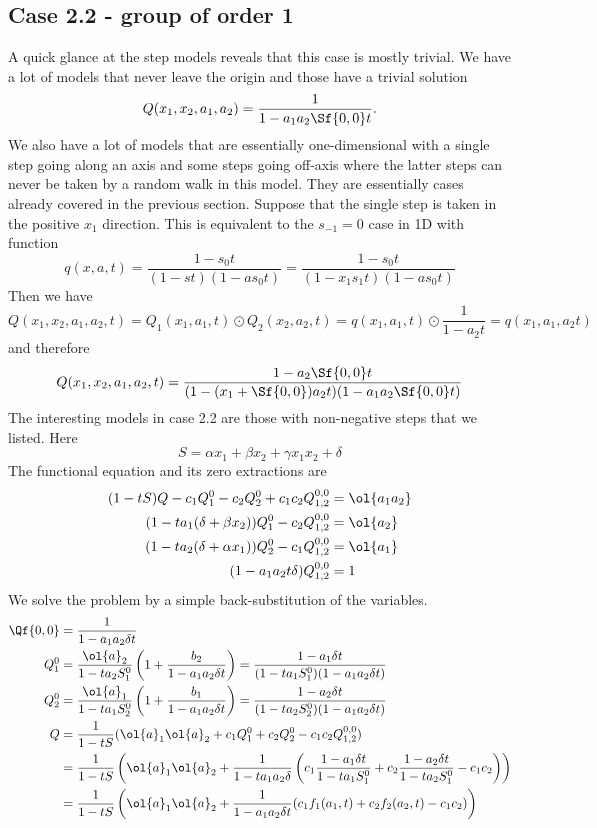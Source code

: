 \subsection{Case 2.2 - group of order 1}
A quick glance at the step models reveals that this case is mostly trivial. We have a lot of models that never leave the origin and those have a trivial solution
\[
	Q(x_1,x_2,a_1,a_2) = \frac{1}{1-a_1a_2 \Sf{0,0} t}.
\]
We also have a lot of models that are essentially one-dimensional with a single step going along an axis and some steps going off-axis where the latter steps can never be taken by a random walk in this model. They are essentially cases already covered in the previous section. Suppose that the single step is taken in the positive $x_1$ direction. This is equivalent to the $s_{-1} = 0$ case in 1D with function
\[
	q(x,a,t) = \frac{1-s_0 t}{(1-st)(1-a s_0 t)} = \frac{1-s_0 t}{(1-x_1s_1 t)(1-a s_0 t)}
\]
Then we have
\[
	Q(x_1,x_2,a_1,a_2,t) = Q_1(x_1,a_1,t) \odot Q_2(x_2,a_2,t) =  q(x_1,a_1,t) \odot \frac{1}{1-a_2 t}= q(x_1,a_1,a_2 t)
\]
and therefore
\[
	Q(x_1,x_2,a_1,a_2,t) = \frac{1-a_2 \Sf{0,0} t}{(1-(x_1+\Sf{0,0})a_2 t)(1-a_1a_2 \Sf{0,0}t)}
\]
The interesting models in case 2.2 are those with non-negative steps that we listed. Here
\[
	S = \alpha x_1 + \beta x_2 + \gamma x_1 x_2 + \delta
\]
The functional equation and its zero extractions are
\begin{align*}
(1-tS)Q - c_1 Q_1^0- c_2 Q_2^0+ c_1c_2 Q_{1,2}^{0,0}  &= \ol{a_1a_2}\\
(1-ta_1 (\delta+\beta x_2))Q_1^0 - c_2Q_{1,2}^{0,0} &=\ol{a_2}\\
(1-ta_2 (\delta+\alpha x_1))Q_2^0 - c_1Q_{1,2}^{0,0}  &=\ol{a_1}\\
(1-a_1 a_2 t \delta)Q_{1,2}^{0,0} &= 1
\end{align*}
We solve the problem by a simple back-substitution of the variables.
\begin{align*}
\Qf{0,0} & = \frac{1}{1-a_1a_2\delta t}\\
Q_1^0 & = \frac{\ol{a}_2}{1-t a_2 S_1^0}\left(1+\frac{b_2}{1-a_1a_2 \delta t}\right) = \frac{1 -  a_1 \delta t}{(1-t a_1S_1^0)(1-a_1a_2\delta t)}\\
Q_2^0 & = \frac{\ol{a}_1}{1-t a_1 S_2^0}\left(1+\frac{b_1}{1-a_1a_2 \delta t}\right) = \frac{1 -  a_2 \delta t}{(1-t a_2S_2^0)(1-a_1a_2\delta t)}\\
Q &= \frac{1}{1-tS}(\ol{a}_1\ol{a}_2 + c_1 Q_1^0 + c_2 Q_2^0 - c_1 c_2 Q_{1,2}^{0,0})\\
&=\frac{1}{1-tS}\left (\ol{a}_1\ol{a}_2 + \frac{1}{1-ta_1a_2 \delta}\left(c_1 \frac{1 -  a_1 \delta t}{1-t a_1S_1^0} + c_2 \frac{1 -  a_2 \delta t}{1-t a_2S_1^0} - c_1 c_2 \right) \right)\\
&= \frac{1}{1-tS}\left(\ol{a}_1\ol{a}_2 + \frac{1}{1-a_1a_2\delta t}(c_1 f_1(a_1,t) + c_2 f_2(a_2,t)-c_1c_2)\right)
\end{align*}
